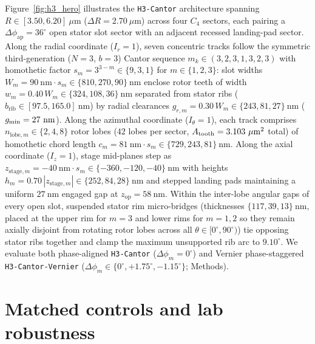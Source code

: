 \documentclass[pdflatex,sn-nature]{sn-jnl}
\begin{document}
Figure~\ref{fig:h3_hero} illustrates the \texttt{H3-Cantor} architecture spanning $R \in [3.50, 6.20]\ \mu\mathrm{m}$ ($\Delta R = 2.70\ \mu\mathrm{m}$) across four $C_4$ sectors, each pairing a $\Delta\phi_{\mathrm{ap}} = 36^\circ$ open stator slot sector with an adjacent recessed landing-pad sector. Along the radial coordinate ($I_r=1$), seven concentric tracks follow the symmetric third-generation ($N=3$, $b=3$) Cantor sequence $m_k \in (3,2,3,1,3,2,3)$ with homothetic factor $s_m = 3^{3-m} \in \{9,3,1\}$ for $m \in \{1,2,3\}$: slot widths $W_m = 90\ \mathrm{nm}\cdot s_m \in \{810, 270, 90\}\ \mathrm{nm}$ enclose rotor teeth of width $w_m = 0.40\,W_m \in \{324, 108, 36\}\ \mathrm{nm}$ separated from stator ribs ($b_{\mathrm{rib}} \in [97.5, 165.0]\ \mathrm{nm}$) by radial clearances $g_{r,m} = 0.30\,W_m \in \{243, 81, 27\}\ \mathrm{nm}$ ($g_{\min} = \RobGminNmDisp{}\ \mathrm{nm}$). Along the azimuthal coordinate ($I_\theta=1$), each track comprises $n_{\mathrm{lobe},m} \in \{2,4,8\}$ rotor lobes ($42$ lobes per sector, $A_{\mathrm{tooth}} = 3.103{}\ \mu\mathrm{m}^2$ total) of homothetic chord length $c_m = 81\ \mathrm{nm}\cdot s_m \in \{729, 243, 81\}\ \mathrm{nm}$. Along the axial coordinate ($I_z=1$), stage mid-planes step as $z_{\mathrm{stage},m} = -40\ \mathrm{nm}\cdot s_m \in \{-360, -120, -40\}\ \mathrm{nm}$ with heights $h_m = 0.70\,|z_{\mathrm{stage},m}| \in \{252, 84, 28\}\ \mathrm{nm}$ and stepped landing pads maintaining a uniform $27\ \mathrm{nm}$ engaged gap at $z_{\mathrm{op}} = 58\ \mathrm{nm}$. Within the inter-lobe angular gaps of every open slot, suspended stator rim micro-bridges (thicknesses $\{117, 39, 13\}\ \mathrm{nm}$, placed at the upper rim for $m=3$ and lower rims for $m=1,2$ so they remain axially disjoint from rotating rotor lobes across all $\theta \in [0^\circ, 90^\circ)$) tie opposing stator ribs together and clamp the maximum unsupported rib arc to $9.10^\circ$. We evaluate both phase-aligned \texttt{H3-Cantor} ($\Delta\phi_m = 0^\circ$) and Vernier phase-staggered \texttt{H3-Cantor-Vernier} ($\Delta\phi_m \in \{0^\circ, +1.75^\circ, -1.15^\circ\}$; Methods).

\section*{Matched controls and lab robustness}
\label{sec:robustness}
\end{document}
